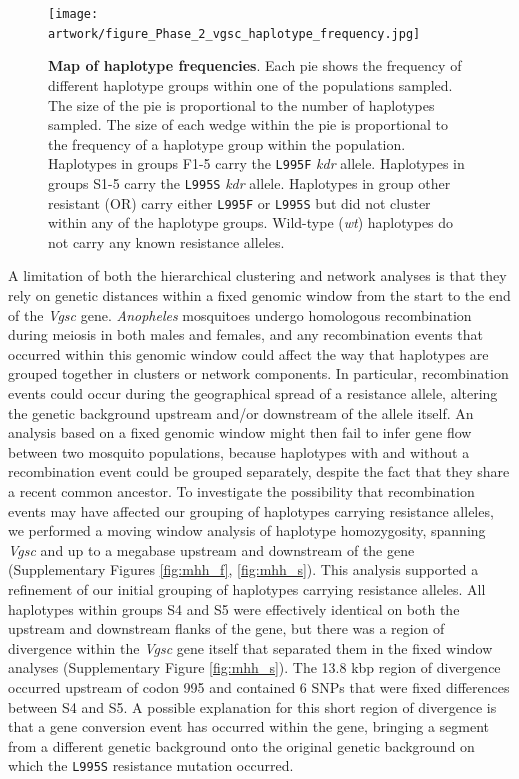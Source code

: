\documentclass[a4paper,11pt,abstracton,hidelinks]{scrartcl}
\begin{document}
%
\begin{figure}[!t]
  \texttt{[image: artwork/figure\_Phase\_2\_vgsc\_haplotype\_frequency.jpg]}
  \caption{\textbf{Map of haplotype frequencies}. Each pie shows the frequency of different haplotype groups within one of the populations sampled. The size of the pie is proportional to the number of haplotypes sampled. The size of each wedge within the pie is proportional to the frequency of a haplotype group within the population. Haplotypes in groups F1-5 carry the \texttt{L995F} \textit{kdr} allele. Haplotypes in groups S1-5 carry the \texttt{L995S} \textit{kdr} allele. Haplotypes in group other resistant (OR) carry either \texttt{L995F} or \texttt{L995S} but did not cluster within any of the haplotype groups. Wild-type (\textit{wt}) haplotypes do not carry any known resistance alleles.}
  \label{fig:map}
\end{figure}


%
A limitation of both the hierarchical clustering and network analyses is that they rely on genetic distances within a fixed genomic window from the start to the end of the \textit{Vgsc} gene.
%
\textit{Anopheles} mosquitoes undergo homologous recombination during meiosis in both males and females, and any recombination events that occurred within this genomic window could affect the way that haplotypes are grouped together in clusters or network components.
%
In particular, recombination events could occur during the geographical spread of a resistance allele, altering the genetic background upstream and/or downstream of the allele itself.
%
An analysis based on a fixed genomic window might then fail to infer gene flow between two mosquito populations, because haplotypes with and without a recombination event could be grouped separately, despite the fact that they share a recent common ancestor.
%
To investigate the possibility that recombination events may have affected our grouping of haplotypes carrying resistance alleles, we performed a moving window analysis of haplotype homozygosity, spanning \textit{Vgsc} and up to a megabase upstream and downstream of the gene (Supplementary Figures \ref{fig:mhh_f}, \ref{fig:mhh_s}).
%
This analysis supported a refinement of our initial grouping of haplotypes carrying resistance alleles.
%
All haplotypes within groups S4 and S5 were effectively identical on both the upstream and downstream flanks of the gene, but there was a region of divergence within the \textit{Vgsc} gene itself that separated them in the fixed window analyses (Supplementary Figure \ref{fig:mhh_s}).
%
The 13.8 kbp region of divergence occurred upstream of codon 995 and contained 6 SNPs that were fixed differences between S4 and S5.
%
A possible explanation for this short region of divergence is that a gene conversion event has occurred within the gene, bringing a segment from a different genetic background onto the original genetic background on which the \texttt{L995S} resistance mutation occurred.
%
\end{document}
